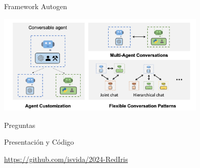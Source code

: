 \documentclass[table, unknownkeysallowed, 10pt]{beamer}
\begin{document}
\begin{frame}{Framework Autogen}
    \begin{center}
        \includegraphics[width=10cm]{imagenes/autogen.png}
    \end{center}
\end{frame}

\begin{frame}{Preguntas}
    \begin{block}{Presentación y Código}
    \begin{center}
        \href{https://github.com/isvida/2024-RedIris}{https://github.com/isvida/2024-RedIris}
    \end{center}
\end{block}
\end{frame}
\end{document}
